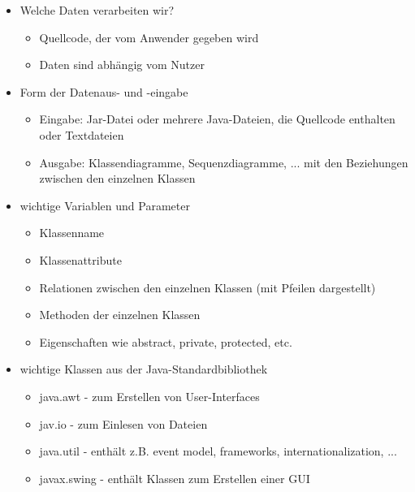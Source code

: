 \begin{itemize}
\item Welche Daten verarbeiten wir?
\begin{itemize}
\item Quellcode, der vom Anwender gegeben wird
\item Daten sind abhängig vom Nutzer
\end{itemize}
\item Form der Datenaus- und -eingabe
\begin{itemize}
\item Eingabe: Jar-Datei oder mehrere Java-Dateien, die Quellcode enthalten oder Textdateien
\item Ausgabe: Klassendiagramme, Sequenzdiagramme, ... mit den Beziehungen zwischen den einzelnen Klassen
\end{itemize}
\item wichtige Variablen und Parameter
\begin{itemize}
\item Klassenname
\item Klassenattribute
\item Relationen zwischen den einzelnen Klassen (mit Pfeilen dargestellt)
\item Methoden der einzelnen Klassen
\item Eigenschaften wie abstract, private, protected, etc.
\end{itemize}
\item wichtige Klassen aus der Java-Standardbibliothek
\begin{itemize}
\item java.awt - zum Erstellen von User-Interfaces
\item jav.io - zum Einlesen von Dateien
\item java.util - enthält z.B. event model, frameworks, internationalization, ...
\item javax.swing - enthält Klassen zum Erstellen einer GUI
\end{itemize}
\end{itemize}
\nsecend